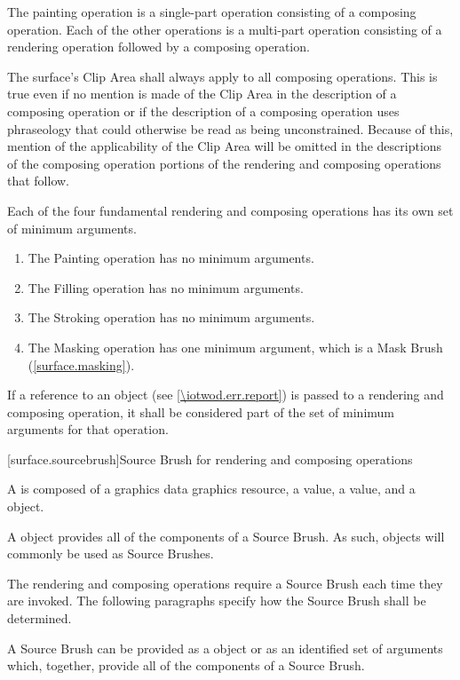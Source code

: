 \pnum
The painting operation is a single-part operation consisting of a composing operation. Each of the other operations is a multi-part operation consisting of a rendering operation followed by a composing operation.

\pnum
The surface's Clip Area shall always apply to all composing operations. This is true even if no mention is made of the Clip Area in the description of a composing operation or if the description of a composing operation uses phraseology that could otherwise be read as being unconstrained.
\enternote
Because of this, mention of the applicability of the Clip Area will be omitted in the descriptions of the composing operation portions of the rendering and composing operations that follow.
\exitnote

\pnum
Each of the four fundamental rendering and composing operations has its own set of minimum arguments.
\begin{enumerate}
	\item The Painting operation has no minimum arguments.
	\item The Filling operation has no minimum arguments.
	\item The Stroking operation has no minimum arguments.
	\item The Masking operation has one minimum argument, which is a Mask Brush (\ref{surface.masking}).
\end{enumerate}

\pnum
If a reference to an  object (see \ref{\iotwod.err.report}) is passed to a rendering and composing operation, it shall be considered part of the set of minimum arguments for that operation.

 [surface.sourcebrush]{Source Brush for rendering and composing operations}

\pnum
A  is composed of a graphics data graphics resource, a  value, a  value, and a  object.

\pnum
A  object provides all of the components of a Source Brush. As such,  objects will commonly be used as Source Brushes.

\pnum
The rendering and composing operations require a Source Brush each time they are invoked. The following paragraphs specify how the Source Brush shall be determined.

\pnum
A Source Brush can be provided as a  object or as an identified set of arguments which, together, provide all of the components of a Source Brush.

